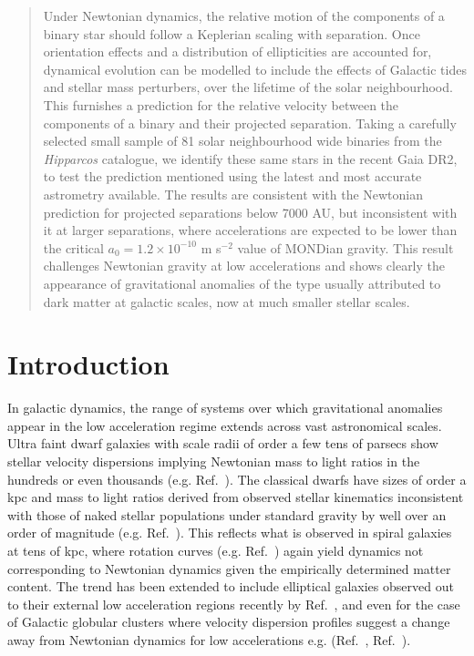 \documentclass{ws-ijmpd}
\begin{document}
\begin{abstract}
Under Newtonian dynamics, the relative motion of the components of a binary star should follow a Keplerian  
  scaling with separation. Once orientation effects and a
  distribution of ellipticities are accounted for, dynamical evolution can be modelled to include the effects
  of Galactic tides and stellar mass perturbers, over the lifetime of the solar neighbourhood. This
  furnishes a prediction for the relative velocity between the components of a binary and their
  projected separation. Taking a carefully selected small sample of 81 solar neighbourhood wide binaries from the 
  {\it Hipparcos} catalogue, we identify these same stars in the recent Gaia DR2, to test
  the prediction mentioned using the latest and most accurate astrometry available. The results are consistent
  with the Newtonian prediction for projected separations below 7000 AU, but inconsistent with it
  at larger separations, where accelerations are expected to be lower than the critical $a_{0}=1.2 \times
  10^{-10} $ { m s$^{-2}$} value of MONDian gravity. This result challenges Newtonian gravity at low
  accelerations and shows clearly the appearance of gravitational anomalies of the type usually attributed to dark
  matter at galactic scales, now at much smaller stellar scales.
\end{abstract}






\section{Introduction}	

In galactic dynamics, the range of systems over which gravitational anomalies appear in the low acceleration regime extends across
vast astronomical scales. Ultra faint dwarf galaxies with scale radii of order a few tens of parsecs show stellar velocity dispersions
implying Newtonian mass to light ratios in the hundreds or even thousands (e.g. Ref.~). The classical dwarfs have sizes
of order a kpc and mass to light ratios derived from observed stellar kinematics inconsistent
with those of naked stellar populations under standard gravity by well over an order of magnitude (e.g. Ref.~). This
reflects what is observed in spiral galaxies at tens of kpc, where rotation curves (e.g. Ref.~) again yield
dynamics not corresponding to Newtonian dynamics given the empirically determined matter content. The trend has been extended to
include elliptical galaxies observed out to their external low acceleration regions recently by Ref.~, and 
even for the case of Galactic globular clusters where velocity dispersion profiles suggest a change away from Newtonian dynamics
for low accelerations e.g. (Ref.~, Ref.~).
\end{document}
